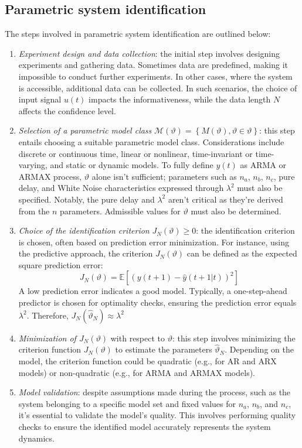 \subsection{Parametric system identification}
The steps involved in parametric system identification are outlined below:
\begin{enumerate} 
    \item \textit{Experiment design and data collection}: the initial step involves designing experiments and gathering data. 
        Sometimes data are predefined, making it impossible to conduct further experiments. 
        In other cases, where the system is accessible, additional data can be collected. 
        In such scenarios, the choice of input signal $u(t)$ impacts the informativeness, while the data length $N$ affects the confidence level.
    \item \textit{Selection of a parametric model class} $\mathcal{M}(\vartheta)=\left\{ M(\vartheta),\vartheta \in \vartheta\right\}$: this step entails choosing a suitable parametric model class.
        Considerations include discrete or continuous time, linear or nonlinear, time-invariant or time-varying, and static or dynamic models. 
        To fully define $y(t)$ as ARMA or ARMAX process, $\vartheta$ alone isn't sufficient; parameters such as $n_a$, $n_b$, $n_c$, pure delay, and  White Noise characteristics expressed through $\lambda^2$ must also be specified.
        Notably, the pure delay and $\lambda^2$ aren't critical as they're derived from the $n$ parameters.
        Admissible values for $\vartheta$ must also be determined.
    \item \textit{Choice of the identification criterion} $J_N(\vartheta)\geq 0$: the identification criterion is chosen, often based on prediction error minimization. 
        For instance, using the predictive approach, the criterion $J_N(\vartheta)$ can be defined as the expected square prediction error:
        \[J_N(\vartheta)=\mathbb{E}\left[ \left(y(t+1)-\hat{y}(t+1|t)\right)^2 \right]\]
        A low prediction error indicates a good model.
        Typically, a one-step-ahead predictor is chosen for optimality checks, ensuring the prediction error equals $\lambda^2$.
        Therefore, $J_N(\hat{\vartheta}_N) \approx \lambda^2$
    \item \textit{Minimization of $J_N(\vartheta)$} with respect to $\vartheta$: this step involves minimizing the criterion function $J_N(\vartheta)$ to estimate the parameters $\hat{\vartheta}_N$.
        Depending on the model, the criterion function could be quadratic (e.g., for AR and ARX models) or non-quadratic (e.g., for ARMA and ARMAX models).
    \item \textit{Model validation}: despite assumptions made during the process, such as the system belonging to a specific model set and fixed values for $n_a$, $n_b$, and $n_c$, it's essential to validate the model's quality. 
        This involves performing quality checks to ensure the identified model accurately represents the system dynamics.
\end{enumerate}